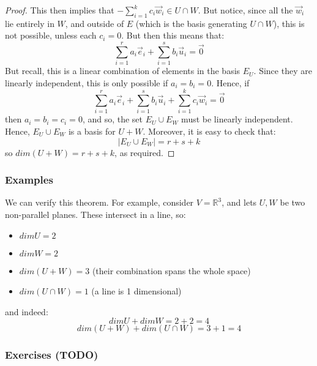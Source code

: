 \documentclass{exam}
\begin{document}
\begin{proof}
This then implies that $-\sum_{i = 1}^k c_i\vec{w}_i \in U \cap W$. But notice, since all the $\vec{w}_i$ lie entirely in $W$, and outside of $E$ (which is the basis generating $U \cap W$), this is not possible, unless each $c_i = 0$. But then this means that:
\[
\sum_{i = 1}^r a_i\vec{e}_i + \sum_{i = 1}^s b_i\vec{u}_i = \vec{0}
\]
But recall, this is a linear combination of elements in the basis $E_U$. Since they are linearly independent, this is only possible if $a_i = b_i = 0$. Hence, if
\[
\sum_{i = 1}^r a_i\vec{e}_i + \sum_{i = 1}^s b_i\vec{u}_i + \sum_{i = 1}^k c_i\vec{w}_i = \vec{0}
\]
then $a_i = b_i = c_i = 0$, and so, the set $E_U \cup E_W$ must be linearly independent. Hence, $E_U \cup E_W$ is a basis for $U + W$. Moreover, it is easy to check that:
\[
|E_U \cup E_W| = r + s + k
\]
so $dim (U + W) = r + s+ k$, as required.

\end{proof}

\subsubsection{Examples}

We can verify this theorem. For example, consider $V = \mathbb{R}^3$, and lets $U, W$ be two non-parallel planes. These intersect in a line, so:
\begin{itemize}
    \item $dim U = 2$
    \item $dim W = 2$
    \item $dim (U + W) = 3$ (their combination spans the whole space)
    \item $dim (U \cap W) = 1$ (a line is 1 dimensional)
\end{itemize}
and indeed:
\[
dim U + dim W = 2 + 2 = 4
\]
\[
dim(U + W) + dim(U \cap W) = 3 + 1 = 4
\]

\subsubsection{Exercises (TODO)}
\end{document}
